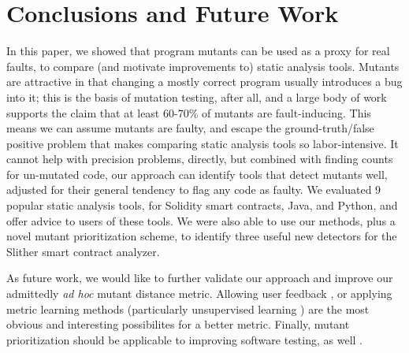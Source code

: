 \section{Conclusions and Future Work}

In this paper, we showed that program mutants can be used as a proxy
for real faults, to compare (and motivate improvements to) static
analysis tools.  Mutants are attractive in that changing a mostly
correct program usually introduces a bug into it; this is the basis of
mutation testing, after all, and a large body of work supports the
claim that at least 60-70\% of mutants are fault-inducing.   This
means we can assume mutants are faulty, and escape the
ground-truth/false positive problem that makes comparing static
analysis tools so labor-intensive.  It cannot help with precision
problems, directly, but combined with finding counts for un-mutated
code, our approach can identify tools that detect mutants well,
adjusted for their general tendency to flag any code as faulty.  We
evaluated 9 popular static analysis tools, for Solidity smart contracts, Java,
and Python, and offer advice to users of these tools.  We were also
able to use our methods, plus a novel mutant prioritization scheme, to
identify three useful new detectors for the Slither smart contract
analyzer.

As future work, we would like to further validate our approach and
improve our admittedly \emph{ad hoc} mutant distance metric.  Allowing
user feedback \cite{EndUserMistake,OnlyOracle}, or applying metric
learning methods \cite{kulis2012metric} (particularly unsupervised
learning \cite{scholkopf1998nonlinear,tipping1999probabilistic}) are
the most obvious and interesting possibilites for a better metric.
Finally, mutant prioritization should be applicable to improving
software testing, as well \cite{groce2018verified}.